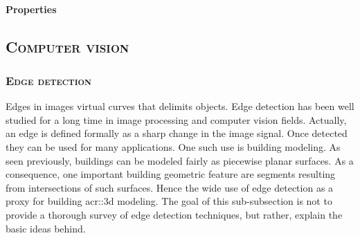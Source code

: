            \paragraph{Properties}
    \subsection{\textsc{Computer vision}}
        \label{subsec::state_of_the_art::mlpr::computer_vision}

        \subsubsection{\textsc{Edge detection}}
            Edges in images virtual curves that delimits objects.
            Edge detection has been well studied for a long time in image processing and computer vision fields.
            Actually, an edge is defined formally as a sharp change in the image signal.
            Once detected they can be used for many applications.
            One such use is building modeling.
            As seen previously, buildings can be modeled fairly as piecewise planar surfaces.
            As a consequence, one important building geometric feature are segments resulting from intersections of such surfaces.
            Hence the wide use of edge detection as a proxy for building \gls{acr::3d} modeling.
            The goal of this sub-subsection is not to provide a thorough survey of edge detection techniques, but rather, explain the basic ideas behind.\\
            
